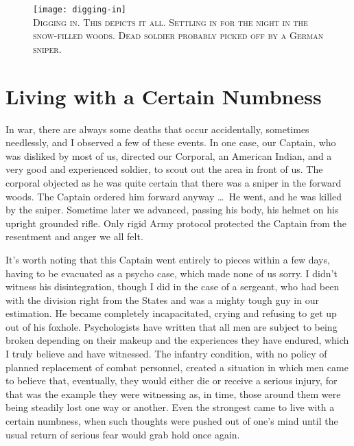 \documentclass[../m3y]{subfiles}
\begin{document}
\begin{figure}[h]
\centering
\texttt{[image: digging-in]}\\
\medskip
{\newtimes\textsc{Digging in. This depicts it all. Settling in for the night in the snow-filled woods. Dead soldier probably picked off by a German sniper.}}
\end{figure}

\section{Living with a Certain Numbness}
In war, there are always some deaths that occur accidentally, sometimes needlessly, and I observed a few of these events. In one case, our Captain, who was disliked by most of us, directed our Corporal, an American Indian, and a very good and experienced soldier, to scout out the area in front of us. The corporal objected as he was quite certain that there was a sniper in the forward woods. The Captain ordered him forward anyway \ldots\ He went, and he was killed by the sniper. Sometime later we advanced, passing his body, his helmet on his upright grounded rifle. Only rigid Army protocol protected the Captain from the resentment and anger we all felt.

It's worth noting that this Captain went entirely to pieces within a few days, having to be evacuated as a psycho case, which made none of us sorry. I didn't witness his disintegration, though I did in the case of a sergeant, who had been with the division right from the States and was a mighty tough guy in our estimation. He became completely incapacitated, crying and refusing to get up out of his foxhole. Psychologists have written that all men are subject to being broken depending on their makeup and the experiences they have endured, which I truly believe and have witnessed. The infantry condition, with no policy of planned replacement of combat personnel, created a situation in which men came to believe that, eventually, they would either die or receive a serious injury, for that was the example they were witnessing as, in time, those around them were being steadily lost one way or another. Even the strongest came to live with a certain numbness, when such thoughts were pushed out of one's mind until the usual return of serious fear would grab hold once again.
\end{document}
